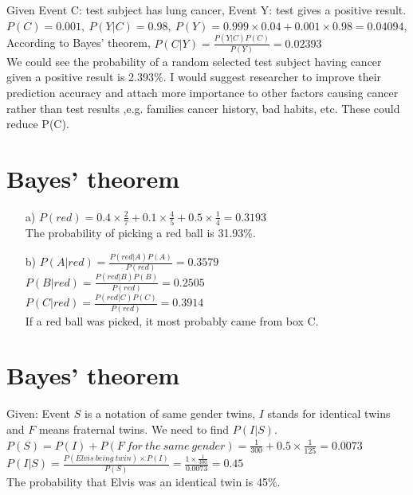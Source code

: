 \documentclass{article}
\begin{document}
Given Event C: test subject has lung cancer, Event Y: test gives a positive result. \\

$P(C)=0.001,\ P(Y|C)=0.98,\ P(Y)=0.999\times0.04+0.001\times0.98=0.04094$, \\

According to Bayes' theorem, $P(C|Y)=\frac{P(Y|C)P(C)}{P(Y)}=0.02393$\\

We could see the probability of a random selected test subject having cancer given a positive result is 2.393\%. I would suggest researcher to improve their prediction accuracy and attach more importance to other factors causing cancer rather than test results ,e.g. families cancer history, bad habits, etc. These could reduce P(C).


\section{Bayes' theorem}

\begin{itemize}

    \item[a)] 
    $P(red)=0.4\times\frac{2}{7}+0.1\times\frac{4}{5}+0.5\times\frac{1}{4}=0.3193$\\
    
    The probability of picking a red ball  is 31.93\%.
    
    \item[b)] 
    $P(A|red)=\frac{P(red|A)P(A)}{P(red)}=0.3579$\\
    
    $P(B|red)=\frac{P(red|B)P(B)}{P(red)}=0.2505$\\
    
    $P(C|red)=\frac{P(red|C)P(C)}{P(red)}=0.3914$\\
    
    If a red ball was picked, it most probably came from box C.
    
\end{itemize}
\section{Bayes' theorem}

Given: Event $S$ is a notation of same gender twins, $I$ stands for identical twins and $F$ means fraternal twins. We need to find $P(I|S)$.\\

$P(S) = P(I) + P(F\ for\ the\ same\ gender) = \frac{1}{300} + 0.5 \times \frac{1}{125} = 0.0073$\\

$P(I|S) = \frac{P(Elvis\ being\ twin) \times P(I)}{P(S)} = \frac{1 \times\frac{1}{300}}{0.0073} = 0.45$\\

The probability that Elvis was an identical twin is 45\%.
\end{document}
